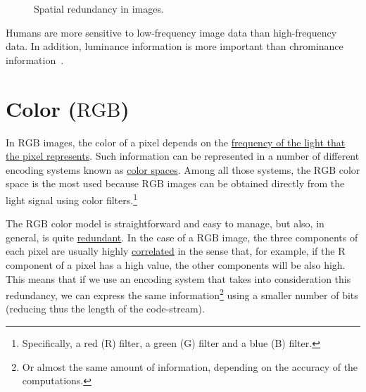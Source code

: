 \begin{figure}
  \caption{Spatial redundancy in images.}
  \label{fig:correlacion_lena}
\end{figure}

Humans are more sensitive to low-frequency image data than high-frequency data. In addition, luminance information is more important than chrominance information~\cite{kondoz2009visual}.

\section{Color ($\text{RGB}$)}
In $\text{RGB}$ images, the color of a pixel depends on the
\href{https://en.wikipedia.org/wiki/Visible_spectrum}{frequency of the
  light that the pixel represents}. Such information can be
represented in a number of different encoding systems known as
\href{https://en.wikipedia.org/wiki/Color_space}{color spaces}. Among
all those systems, the $\text{RGB}$ color space is the most used
because $\text{RGB}$ images can be obtained directly from the light
signal using color filters.\footnote{Specifically, a red (R) filter, a
green (G) filter and a blue (B) filter.}

The $\text{RGB}$ color model is straightforward and easy to manage,
but also, in general, is quite
\href{https://en.wikipedia.org/wiki/Data_redundancy}{redundant}. In
the case of a $\text{RGB}$ image, the three components of each pixel
are usually highly
\href{https://en.wikipedia.org/wiki/Correlation_and_dependence}{correlated}
in the sense that, for example, if the $\text{R}$ component of a pixel
has a high value, the other components will be also high. This means
that if we use an encoding system that takes into consideration this
redundancy, we can express the same information\footnote{Or almost the
same amount of information, depending on the accuracy of the
computations.} using a smaller number of bits (reducing thus the
length of the code-stream).


%
